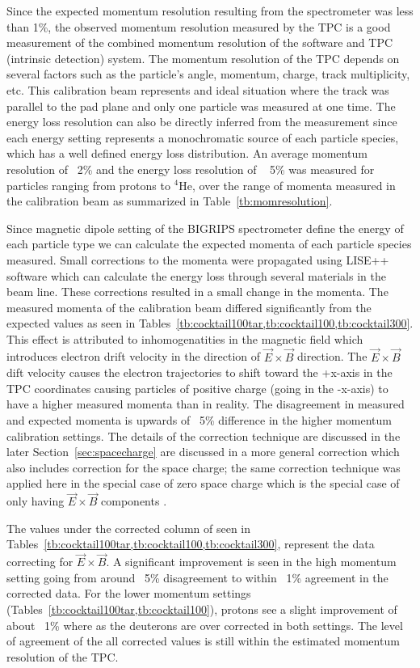 Since the expected momentum resolution resulting from the spectrometer was less than 1\%, the observed momentum resolution measured by the TPC is a good measurement of the combined momentum resolution of the software and TPC (intrinsic detection) system. The momentum resolution of the TPC depends on several factors such as the particle's angle, momentum, charge, track multiplicity, etc. This calibration beam represents and ideal situation where the track was parallel to the pad plane and only one particle was measured at one time. The energy loss resolution can also be directly inferred from the measurement since each energy setting represents a monochromatic source of each particle species, which has a well defined energy loss distribution. An average momentum resolution of ~2\% and the energy loss resolution of ~ 5\% was measured for particles ranging from protons to ${}^{4}$He, over the range of momenta measured in the calibration beam as summarized in Table~\ref{tb:momresolution}.

Since magnetic dipole setting of the BIGRIPS spectrometer define the energy of each particle type we can calculate the expected momenta of each particle species measured. Small corrections to the momenta were propagated using LISE++ software which can calculate the energy loss through several materials in the beam line. These corrections resulted in a small change in the momenta. The measured momenta of the calibration beam differed significantly from the expected values as seen in Tables~\cref{tb:cocktail100tar,tb:cocktail100,tb:cocktail300}. This effect is attributed to inhomogenatities in the magnetic field which introduces electron drift velocity in the direction of $\vec{E}\times\vec{B}$ direction. The $\vec{E}\times\vec{B}$ dift velocity causes the electron trajectories to shift toward the +x-axis in the TPC coordinates causing particles of positive charge (going in the -x-axis) to have a higher measured momenta than in reality. The disagreement in measured and expected momenta is upwards of ~5\% difference in the higher momentum calibration settings. The details of the correction technique are discussed in the later Section~\ref{sec:spacecharge} are discussed in a more general correction which also includes correction for the space charge; the same correction technique was applied here in the special case of zero space charge which is the special case of only having $\vec{E}\times\vec{B}$ components .

The values under the corrected column of seen in Tables~\cref{tb:cocktail100tar,tb:cocktail100,tb:cocktail300}, represent the data correcting for $\vec{E}\times\vec{B}$. A significant improvement is seen in the high momentum setting going from around ~5\% disagreement to within ~1\% agreement in the corrected data. For the lower momentum settings (Tables~\cref{tb:cocktail100tar,tb:cocktail100}), protons see a slight improvement of about ~1\% where as the deuterons are over corrected in both settings. The level of agreement of the all corrected values is still within the estimated momentum resolution of the TPC. 


